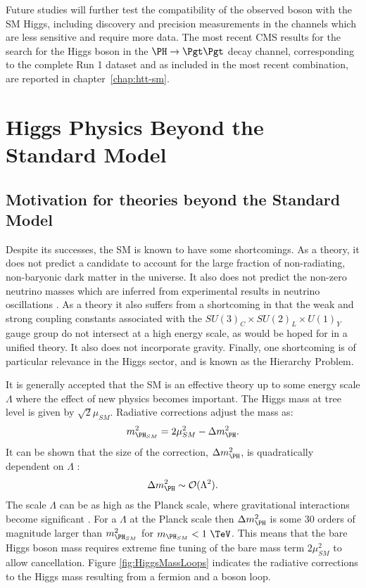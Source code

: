 Future studies will further test the compatibility of the observed boson with
the \ac{SM} Higgs, including discovery and precision measurements in the
channels which are less sensitive and require more data. 
The most recent CMS results for the search for the Higgs boson in the $\HToTauTau$
decay channel, corresponding to the complete Run 1 dataset and as included in
the most recent combination, are reported in chapter~\ref{chap:htt-sm}.

\section{Higgs Physics Beyond the Standard Model}
\label{sec:BSM}

\subsection{Motivation for theories beyond the Standard Model}
\label{sec:hierarchyproblem}

Despite its successes, the \ac{SM} is known to have some shortcomings. As a
theory, it does not predict a candidate to account for the large fraction of
non-radiating, non-baryonic dark matter in the universe. It also does not
predict the non-zero neutrino masses which are inferred from experimental
results in neutrino oscillations \cite{PDG}. As a theory it also suffers from a
shortcoming in that the weak and strong coupling constants associated with the
$SU(3)_{C} \times SU(2)_{L} \times U(1)_{Y}$ gauge group do not intersect at a
high energy scale, as would be hoped for in a unified theory. It also does not
incorporate gravity. Finally, one shortcoming is of particular relevance 
in the Higgs sector, and is known as the Hierarchy Problem.

It is generally accepted that the \ac{SM} is an effective theory up to some
energy scale $\Lambda$ where the effect of new physics becomes important. 
The Higgs mass at tree level is given by $\sqrt{2}\mu_{SM}$. Radiative
corrections adjust the mass as:
\begin{equation}
m_{\PH_{SM}}^{2} = 2\mu_{SM}^{2} - \Delta m_{\PH}^{2}. 
\end{equation}
It can be shown that the size of the correction, $\Delta m_{\PH}^{2}$, is
quadratically dependent on $\Lambda$ \cite{Carena:2002es}:
\begin{equation}
\Delta m_{\PH}^{2} \sim \mathcal{O}(\Lambda^{2}).
\end{equation}
The scale $\Lambda$ can be as high as the Planck scale, where gravitational
interactions become significant \cite{Griffiths:2008nx}. For a $\Lambda$ at the Planck scale then
$\Delta m_{\PH}^{2}$ is some 30 orders of magnitude larger than 
$m_{\PH_{SM}}^{2}$ for $m_{\PH_{SM}}<1~\TeV$. This means that the bare Higgs
boson mass requires extreme fine tuning of the bare mass term $2\mu_{SM}^{2}$ to
allow cancellation. Figure \ref{fig:HiggsMassLoops} indicates the radiative
corrections to the Higgs mass resulting from a fermion and a boson loop.

